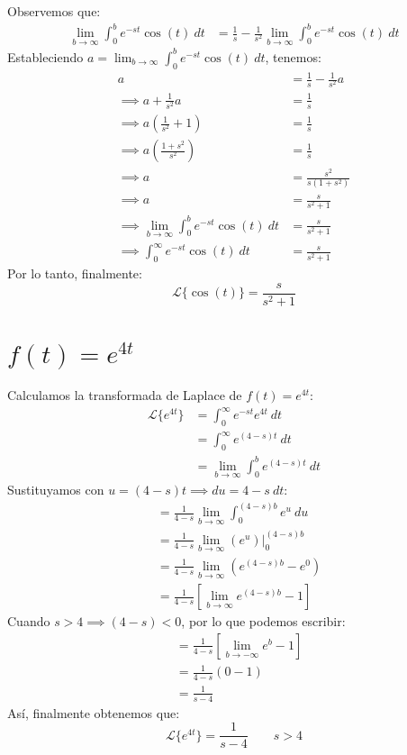 \documentclass[12pt, a4paper]{article}
\begin{document}
Observemos que:
\begin{align*}
	\lim_{b \to \infty} \int_{0}^{b} e^{-st} \cos (t) \ dt &= \frac{1}{s} - \frac{1}{s^{2}}\lim_{b \to \infty} \int_{0}^{b} e^{-st} \cos (t) \ dt
\end{align*}
Estableciendo \(a = \lim_{b \to \infty} \int_{0}^{b} e^{-st} \cos (t) \ dt\), tenemos:
\begin{align*}
	a &= \frac{1}{s} - \frac{1}{s ^{2}} a \\
	\implies a + \frac{1}{s ^{2}} a &= \frac{1}{s} \\
	\implies a \left(\frac{1}{s ^{2}} + 1 \right) &= \frac{1}{s} \\
	\implies a \left( \frac{1+s ^{2}}{s ^{2}} \right) &= \frac{1}{s} \\
	\implies a &= \frac{s ^{2}}{s(1+s ^{2})} \\
	\implies a &= \frac{s}{s ^{2} + 1} \\
	\implies \lim_{b \to \infty} \int_{0}^{b} e^{-st} \cos (t) \ dt &= \frac{s}{s ^{2} + 1} \\
	\implies \int_{0}^{\infty} e^{-st} \cos (t) \ dt &= \frac{s}{s ^{2} + 1}
\end{align*}
Por lo tanto, finalmente:
\[
	\mathcal{L}\{\cos (t)\} = \frac{s}{s ^{2} + 1}
\]


\setcounter{section}{10}
\section{\texorpdfstring{\(f(t)=e^{4t}\)}{f (t) = e (4t) }}

Calculamos la transformada de Laplace de \(f(t) = e^{4t}\):
\begin{align*}
	\mathcal{L}\{e^{4t}\} &= \int_{0}^{\infty} e^{-st} e^{4t}\ dt \\
	&= \int_{0}^{\infty} e^{(4-s)t} \ dt \\
	&= \lim_{b \to \infty} \int_{0}^{b} e^{(4-s)t} \ dt
\end{align*}
Sustituyamos con \(u = (4-s) t \implies du = 4-s\ dt\):
\begin{align*}
	&= \frac{1}{4-s} \lim_{b \to \infty} \int_{0}^{(4-s)b} e^{u} \ du \\
	&= \frac{1}{4-s} \lim_{b \to \infty} \left. \left( e^{u} \right)  \right|_{0}^{(4-s)b} \\
	&= \frac{1}{4-s} \lim_{b \to \infty} \left( e^{(4-s)b} - e^{0} \right) \\
	&= \frac{1}{4-s} \left[ \lim_{b \to \infty} e^{(4-s)b} - 1 \right]
\end{align*}
Cuando \(s > 4 \implies (4-s) < 0\), por lo que podemos escribir:
\begin{align*}
	&= \frac{1}{4-s} \left[ \lim_{b \to -\infty} e^{b} - 1 \right] \\
	&= \frac{1}{4-s} (0 - 1) \\
	&= \frac{1}{s-4}
\end{align*}
Así, finalmente obtenemos que:
\[
	\mathcal{L}\{e^{4t}\} = \frac{1}{s-4} \qquad s > 4
\]
\end{document}
